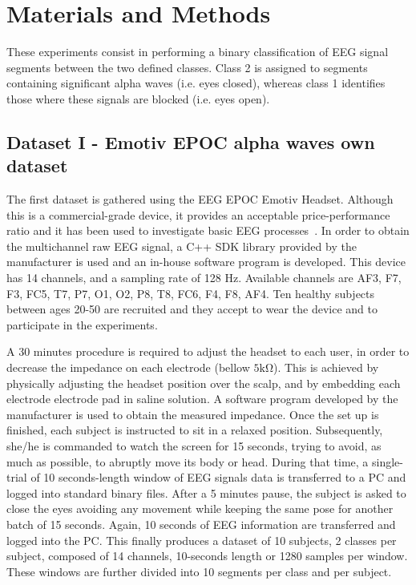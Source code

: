 \section{Materials and Methods}

These experiments consist in performing a binary classification of EEG signal segments between the two defined classes.  Class 2 is assigned to segments containing significant alpha waves (i.e. eyes closed), whereas class 1 identifies those where these signals are blocked (i.e. eyes open).


\subsection{Dataset I - Emotiv EPOC alpha waves own dataset}
\label{dataset1}
The first dataset is gathered using the EEG EPOC Emotiv Headset.  Although this is a commercial-grade device, it provides an acceptable price-performance ratio and it has been used to investigate basic EEG processes~\cite{Debener2012,DeVos2014}. In order to obtain the multichannel raw EEG signal, a C++ SDK library provided by the manufacturer is used and an in-house software program is developed. This device has 14 channels, and a sampling rate of 128 \si{Hz}\cite{Stopczynski2014}. Available channels are AF3, F7, F3, FC5, T7, P7, O1, O2, P8, T8,  FC6, F4, F8, AF4.  Ten healthy subjects between ages 20-50 are recruited and they accept to wear the device and to participate in the experiments.  

A 30 minutes procedure is required to adjust the headset to each user, in order to decrease the impedance on each electrode (bellow $5 \si{\kilo\ohm}$).  
This is achieved by physically adjusting the headset position over the scalp, and by embedding each electrode electrode pad in saline solution.
A software program developed by the manufacturer is used to obtain the measured impedance.  Once the set up is finished, each subject is instructed to sit in a relaxed position. Subsequently, she/he is commanded to watch the screen for 15 seconds, trying to avoid, as much as possible, to abruptly move its body or head.  During that time, a single-trial of 10 seconds-length window of EEG signals data is transferred to a PC and logged into standard binary files. After a 5 minutes pause, the subject is asked to close the eyes avoiding any movement while keeping the same pose for another batch of 15 seconds.  Again, 10 seconds of EEG information are transferred and logged into the PC. This finally produces a dataset of 10 subjects,  2 classes per subject, composed of 14 channels, 10-seconds length or 1280 samples per window.  These windows are further divided into 10 segments per class and per subject.

